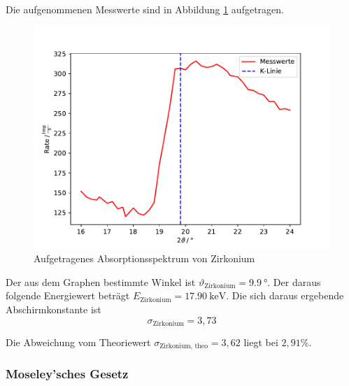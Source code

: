 Die aufgenommenen Messwerte sind in Abbildung \ref{fig:zir} aufgetragen.
\begin{figure}[H]
  \centering
  \includegraphics[width=\textwidth]{Plots/zirkonium.pdf}
  \caption{Aufgetragenes Absorptionsspektrum von Zirkonium}
  \label{fig:zir}
\end{figure}

Der aus dem Graphen bestimmte Winkel ist $\vartheta_\text{Zirkonium} = \SI{9,9}{°}$. Der daraus folgende Energiewert beträgt $E_\text{Zirkonium} = \SI{17,90}{\keV}$.
Die sich daraus ergebende Abschirmkonstante ist
\begin{equation*}
  \sigma_\text{Zirkonium} = 3,73
\end{equation*}

Die Abweichung vom Theoriewert $\sigma_\text{Zirkonium, theo} = 3,62$ liegt bei $2,91 \%$.

\subsubsection{Moseley'sches Gesetz}

